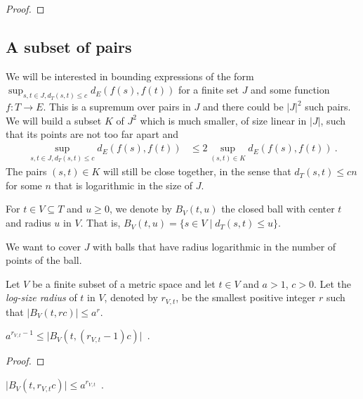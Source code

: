 \begin{proof}\leanok

\end{proof}


\subsection{A subset of pairs}

We will be interested in bounding expressions of the form $\sup_{s,t\in J, d_T(s,t) \le c} d_E(f(s), f(t))$ for a finite set $J$ and some function $f : T \to E$.
This is a supremum over pairs in $J$ and there could be $\vert J \vert^2$ such pairs.
We will build a subset $K$ of $J^2$ which is much smaller, of size linear in $\vert J \vert$, such that its points are not too far apart and
\begin{align*}
  \sup_{s,t\in J, d_T(s,t) \le c} d_E(f(s), f(t))
  & \le 2 \sup_{(s,t) \in K} d_E(f(s), f(t))
  \: .
\end{align*}
The pairs $(s, t) \in K$ will still be close together, in the sense that $d_T(s, t) \le c n$ for some $n$ that is logarithmic in the size of $J$.

For $t \in V \subseteq T$ and $u\ge 0$, we denote by $B_V(t, u)$ the closed ball with center $t$ and radius $u$ in $V$.
That is, $B_V(t, u) = \{s \in V \mid d_T(s, t) \le u\}$.

We want to cover $J$ with balls that have radius logarithmic in the number of points of the ball.

\begin{definition}\label{def:logSizeRadius}
  \mathlibok
Let $V$ be a finite subset of a metric space and let $t \in V$ and $a > 1$, $c > 0$.
Let the \emph{log-size radius} of $t$ in $V$, denoted by $r_{V,t}$, be the smallest positive integer $r$ such that $\vert B_V(t, r c) \vert \le a^{r}$.
\end{definition}


\begin{lemma}\label{lem:card_logSizeRadius_ge}
  \mathlibok
$a^{r_{V,t}-1} \le \vert B_V(t, (r_{V,t}-1)c) \vert$~.
\end{lemma}

\begin{proof}
\end{proof}


\begin{lemma}\label{lem:card_logSizeRadius_le}
  \mathlibok
$\vert B_V(t, r_{V,t}c) \vert \le a^{r_{V,t}}$~.
\end{lemma}

